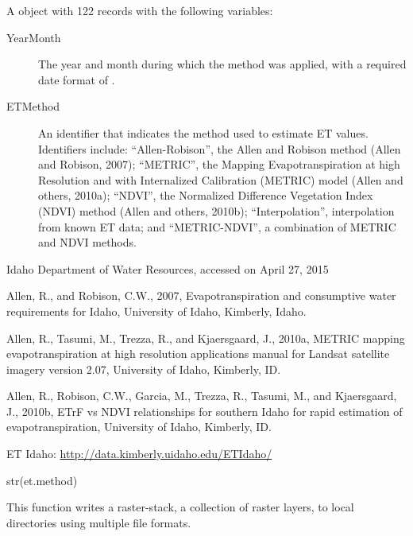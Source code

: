 \documentclass[letterpaper]{book}
\begin{document}
\begin{Format}
A  object with 122 records with the following variables:
\begin{description}

\item[YearMonth] The year and month during which the method was applied, with a required date format of .
\item[ETMethod] An identifier that indicates the method used to estimate ET values.
Identifiers include:
``Allen-Robison'', the Allen and Robison method (Allen and Robison, 2007);
``METRIC'', the Mapping Evapotranspiration at high Resolution and with Internalized Calibration (METRIC) model (Allen and others, 2010a);
``NDVI'', the Normalized Difference Vegetation Index (NDVI) method (Allen and others, 2010b);
``Interpolation'', interpolation from known ET data; and
``METRIC-NDVI'', a combination of METRIC and NDVI methods.


\end{description}

\end{Format}
%
\begin{Source}\relax
Idaho Department of Water Resources, accessed on April 27, 2015
\end{Source}
%
\begin{References}\relax
Allen, R., and Robison, C.W., 2007, Evapotranspiration and consumptive water requirements for Idaho, University of Idaho, Kimberly, Idaho.

Allen, R., Tasumi, M., Trezza, R., and Kjaersgaard, J., 2010a, METRIC mapping evapotranspiration at high resolution applications manual for Landsat satellite imagery version 2.07, University of Idaho, Kimberly, ID.

Allen, R., Robison, C.W., Garcia, M., Trezza, R., Tasumi, M., and Kjaersgaard, J., 2010b, ETrF vs NDVI relationships for southern Idaho for rapid estimation of evapotranspiration, University of Idaho, Kimberly, ID.

ET Idaho: \url{http://data.kimberly.uidaho.edu/ETIdaho/}
\end{References}
%
\begin{Examples}
\begin{ExampleCode}
str(et.method)
\end{ExampleCode}
\end{Examples}
%
\begin{Description}\relax
This function writes a raster-stack, a collection of raster layers, to local directories using multiple file formats.
\end{Description}
\end{document}
